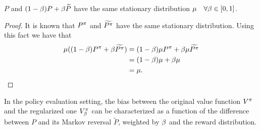 \begin{lemma}
\label{cor:same_stationary_dist}
$P$ and $(1-\beta) P + \beta \widetilde{P}$ have the same stationary distribution $\mu \quad \forall \beta \in [0,1]$.
\end{lemma}
\begin{proof}
It is known that $P^{\pi}$ and $\widetilde{P^{\pi}}$ have the same stationary distribution. Using this fact we have that
\begin{equation}
    \begin{split}
        \mu( (1-\beta) P^{\pi} + \beta \widetilde{P^{\pi}}) &=  (1-\beta) \mu P^{\pi} + \beta \mu \widetilde{P^{\pi}} \\
        &= (1-\beta)\mu + \beta \mu\\
        &= \mu.
    \end{split}
\end{equation}
\end{proof} 


In the policy evaluation setting, the bias between the original value function $V^{\pi}$ and the regularized one $V^{\pi}_{\beta}$ can be characterized as a function of the difference between $P$ and its Markov reversal $\widetilde{P}$, weighted by $\beta$ and the reward distribution.


